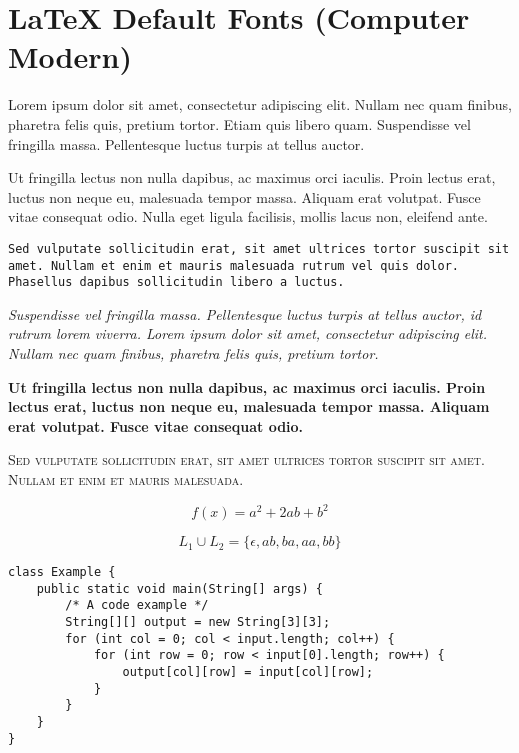 \documentclass{article}
\begin{document}
\section*{LaTeX Default Fonts (Computer Modern)}

\bigskip\noindent Lorem ipsum dolor sit amet, consectetur adipiscing elit. Nullam
nec quam finibus, pharetra felis quis, pretium tortor. Etiam quis libero quam.
Suspendisse vel fringilla massa. Pellentesque luctus turpis at tellus auctor.

\bigskip\noindent\textsf{Ut fringilla lectus non nulla dapibus, ac maximus orci
iaculis. Proin lectus erat, luctus non neque eu, malesuada tempor massa. Aliquam
erat volutpat. Fusce vitae consequat odio. Nulla eget ligula facilisis, mollis
lacus non, eleifend ante.}

\bigskip\noindent\texttt{Sed vulputate sollicitudin erat, sit amet ultrices
tortor suscipit sit amet. Nullam et enim et mauris malesuada rutrum vel quis
dolor. Phasellus dapibus sollicitudin libero a luctus.} 

\bigskip\noindent\textit{Suspendisse vel fringilla massa. Pellentesque luctus
turpis at tellus auctor, id rutrum lorem viverra. Lorem ipsum dolor sit amet,
consectetur adipiscing elit. Nullam nec quam finibus, pharetra felis quis,
pretium tortor.}

\bigskip\noindent\textbf{Ut fringilla lectus non nulla dapibus, ac maximus orci
iaculis. Proin lectus erat, luctus non neque eu, malesuada tempor massa. Aliquam
erat volutpat. Fusce vitae consequat odio.}

\bigskip\noindent\textsc{Sed vulputate sollicitudin erat, sit amet ultrices
tortor suscipit sit amet. Nullam et enim et mauris malesuada.} 

\bigskip

\begin{equation}
    f(x) = a^2 + 2ab + b^2
\end{equation}

\begin{equation}
    L_1 \cup L_2 = \{\epsilon, ab, ba, aa, bb\}
\end{equation}

\bigskip

\begin{verbatim}
class Example {
    public static void main(String[] args) {
        /* A code example */
        String[][] output = new String[3][3];
        for (int col = 0; col < input.length; col++) {
            for (int row = 0; row < input[0].length; row++) {
                output[col][row] = input[col][row];
            }
        }
    }
}
\end{verbatim}
\end{document}
